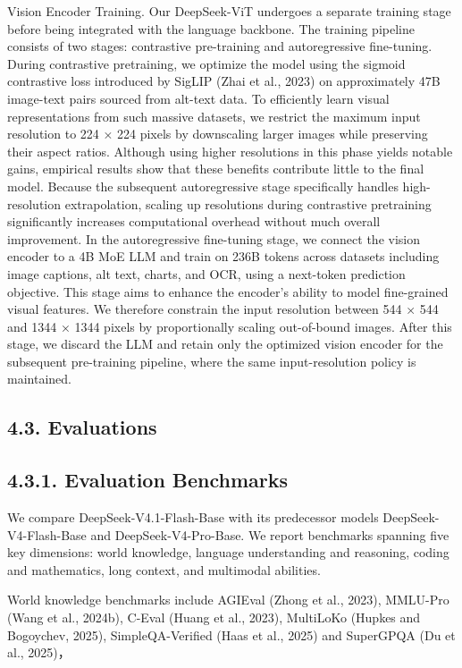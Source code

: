 \documentclass[
  10
]{article}
\begin{document}
Vision Encoder Training. Our DeepSeek-ViT undergoes a separate training
stage before being integrated with the language backbone. The training
pipeline consists of two stages: contrastive pre-training and
autoregressive fine-tuning. During contrastive pretraining, we optimize
the model using the sigmoid contrastive loss introduced by SigLIP (Zhai
et al., 2023) on approximately 47B image-text pairs sourced from
alt-text data. To efficiently learn visual representations from such
massive datasets, we restrict the maximum input resolution to 224 × 224
pixels by downscaling larger images while preserving their aspect
ratios. Although using higher resolutions in this phase yields notable
gains, empirical results show that these benefits contribute little to
the final model. Because the subsequent autoregressive stage
specifically handles high-resolution extrapolation, scaling up
resolutions during contrastive pretraining significantly increases
computational overhead without much overall improvement. In the
autoregressive fine-tuning stage, we connect the vision encoder to a 4B
MoE LLM and train on 236B tokens across datasets including image
captions, alt text, charts, and OCR, using a next-token prediction
objective. This stage aims to enhance the encoder's ability to model
fine-grained visual features. We therefore constrain the input
resolution between 544 × 544 and 1344 × 1344 pixels by proportionally
scaling out-of-bound images. After this stage, we discard the LLM and
retain only the optimized vision encoder for the subsequent pre-training
pipeline, where the same input-resolution policy is maintained.

\subsection{4.3. Evaluations}\label{evaluations}

\subsection{4.3.1. Evaluation Benchmarks}\label{evaluation-benchmarks}

We compare DeepSeek-V4.1-Flash-Base with its predecessor models
DeepSeek-V4-Flash-Base and DeepSeek-V4-Pro-Base. We report benchmarks
spanning five key dimensions: world knowledge, language understanding
and reasoning, coding and mathematics, long context, and multimodal
abilities.

World knowledge benchmarks include AGIEval (Zhong et al., 2023),
MMLU-Pro (Wang et al., 2024b), C-Eval (Huang et al., 2023), MultiLoKo
(Hupkes and Bogoychev, 2025), SimpleQA-Verified (Haas et al., 2025) and
SuperGPQA (Du et al., 2025)，
\end{document}
